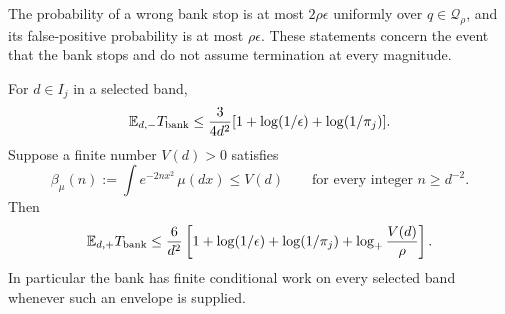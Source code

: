 \begin{lemma}\label{lem:uf-mixture-bank}
The probability of a wrong bank stop is at most $2\rho\epsilon$
uniformly over $q\in\mathcal Q_\rho$, and its false-positive probability
is at most $\rho\epsilon$. These statements concern the event that the
bank stops and do not assume termination at every magnitude.

For $d\in I_j$ in a selected band,
\begin{equation}\label{eq:uf-bank-negative}
 \mathbb E_{d,-}T_{\rm bank}
 \le\frac3{4d^2}
       [1+\log(1/\epsilon)+\log(1/\pi_j)].
\end{equation}
Suppose a finite number $V(d)>0$ satisfies
\[
 \beta_\mu(n):=\int e^{-2nx^2}\,\mu(dx)\le V(d)
 \qquad\text{for every integer }n\ge d^{-2}.
\]
Then
\begin{equation}\label{eq:uf-bank-positive}
 \mathbb E_{d,+}T_{\rm bank}
 \le\frac6{d^2}
 \left[1+\log(1/\epsilon)+\log(1/\pi_j)
                   +\log_+\frac{V(d)}{\rho}\right].
\end{equation}
In particular the bank has finite conditional work on every selected
band whenever such an envelope is supplied.
\end{lemma}

